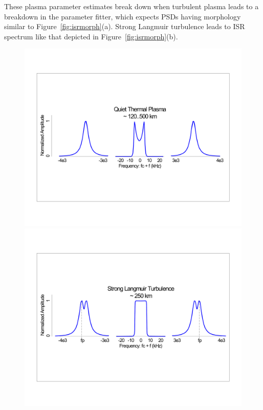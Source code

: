 These plasma parameter estimates break down when turbulent plasma leads to a breakdown in the parameter fitter, which expects PSDs having morphology similar to Figure~\ref{fig:isrmorph}(a).
Strong Langmuir turbulence \citep{akbari2012} leads to ISR spectrum like that depicted in Figure~\ref{fig:isrmorph}(b).
\begin{figure}\centering
    \includegraphics[width=0.8\columnwidth,trim=80 260 100 280,clip]{gfx/isr_thermal}

    \includegraphics[width=0.8\columnwidth,trim=80 260 100 270,clip]{gfx/isr_slt}


\end{figure}
